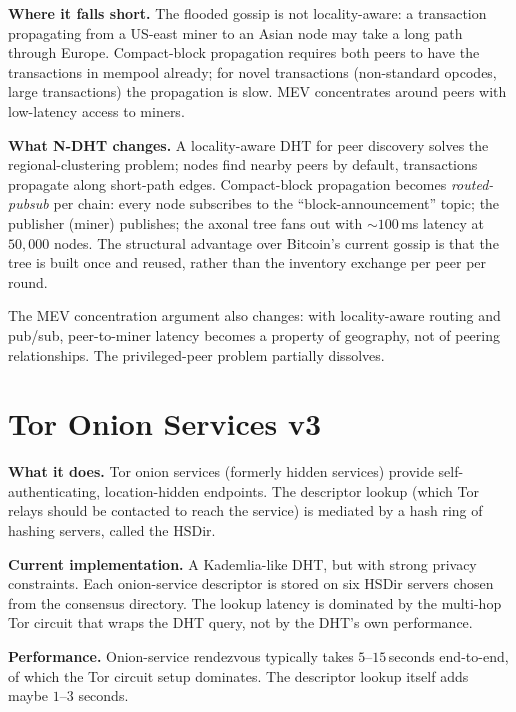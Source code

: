 \documentclass[twoside,nobib]{tufte-book}
\newcommand{\NDHT}{N-DHT\xspace}
\begin{document}
\textbf{Where it falls short.} The flooded gossip is not
locality-aware: a transaction propagating from a US-east miner
to an Asian node may take a long path through Europe.
Compact-block propagation requires both peers to have the
transactions in mempool already; for novel transactions
(non-standard opcodes, large transactions) the propagation is
slow. MEV concentrates around peers with low-latency access to
miners.

\textbf{What \NDHT changes.} A locality-aware DHT for peer
discovery solves the regional-clustering problem; nodes find
nearby peers by default, transactions propagate along
short-path edges. Compact-block propagation becomes
\emph{routed-pubsub} per chain: every node subscribes to the
``block-announcement'' topic; the publisher (miner) publishes;
the axonal tree fans out with $\sim 100$\,ms latency at $50{,}000$
nodes. The structural advantage over Bitcoin's current gossip is
that the tree is built once and reused, rather than the inventory
exchange per peer per round.

The MEV concentration argument also changes: with locality-aware
routing and pub/sub, peer-to-miner latency becomes a property of
geography, not of peering relationships. The privileged-peer
problem partially dissolves.

\section{Tor Onion Services v3}

\textbf{What it does.} Tor onion services (formerly hidden
services) provide self-authenticating, location-hidden
endpoints. The descriptor lookup (which Tor relays should be
contacted to reach the service) is mediated by a hash ring of
hashing servers, called the HSDir.

\textbf{Current implementation.} A Kademlia-like DHT, but with
strong privacy constraints. Each onion-service descriptor is
stored on six HSDir servers chosen from the consensus directory.
The lookup latency is dominated by the multi-hop Tor circuit
that wraps the DHT query, not by the DHT's own performance.

\textbf{Performance.} Onion-service rendezvous typically takes
$5$--$15$\,seconds end-to-end, of which the Tor circuit setup
dominates. The descriptor lookup itself adds maybe $1$--$3$
seconds.
\end{document}
